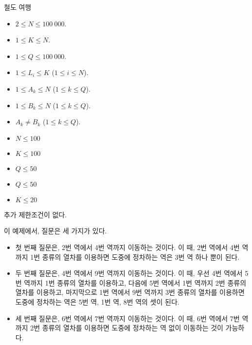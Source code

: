 \begin{problem}{철도 여행}
	\Constraints
	
	\begin{itemize}
		
		\item $2 \le N \le 100\ 000$.
		\item $1 \le K \le N$.
		\item $1 \le Q \le 100\ 000$.
		\item $1 \le L_i \le K$ ($1 \le i \le N$).
		\item $1 \le A_k \le N$ ($1 \le k \le Q$).
		\item $1 \le B_k \le N$ ($1 \le k \le Q$).
		\item $A_k \ne B_k$ ($1 \le k \le Q$).
	\end{itemize}
	
	
	\begin{itemize}
		\item $N \le 100$
		\item $K \le 100$
		\item $Q \le 50$
	\end{itemize}

	\begin{itemize}
		\item $Q \le 50$
	\end{itemize}

	\begin{itemize}
		\item $K \le 20$
	\end{itemize}
	
	
	추가 제한조건이 없다.
	
	\Examples
	
	\begin{example}
	\end{example}
	
	이 예제에서, 질문은 세 가지가 있다.
	
	\begin{itemize}
		\item 첫 번째 질문은, 2번 역에서 4번 역까지 이동하는 것이다. 이 때, 2번 역에서 4번 역까지 1번 종류의 열차를 이용하면 도중에 정차하는 역은 3번 역 하나 뿐이 된다.
		\item 두 번째 질문은, 4번 역에서 9번 역까지 이동하는 것이다. 이 때, 우선 4번 역에서 5번 역까지 1번 종류의 열차를 이용하고, 다음에 5번 역에서 1번 역까지 2번 종류의 열차를 이용하고, 마지막으로 1번 역에서 9번 역까지 3번 종류의 열차를 이용하면 도중에 정차하는 역은 5번 역, 1번 역, 8번 역의 셋이 된다.
		\item 세 번째 질문은, 6번 역에서 7번 역까지 이동하는 것이다. 이 때, 6번 역에서 7번 역까지 2번 종류의 열차를 이용하면 도중에 정차하는 역 없이 이동하는 것이 가능하다.
	\end{itemize}
	


\end{problem}
